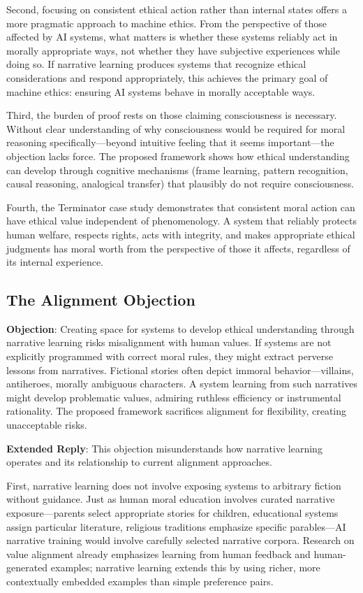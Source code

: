 \documentclass[12pt]{article}
\begin{document}
Second, focusing on consistent ethical action rather than internal states offers a more pragmatic approach to machine ethics. From the perspective of those affected by AI systems, what matters is whether these systems reliably act in morally appropriate ways, not whether they have subjective experiences while doing so. If narrative learning produces systems that recognize ethical considerations and respond appropriately, this achieves the primary goal of machine ethics: ensuring AI systems behave in morally acceptable ways.

Third, the burden of proof rests on those claiming consciousness is necessary. Without clear understanding of why consciousness would be required for moral reasoning specifically---beyond intuitive feeling that it seems important---the objection lacks force. The proposed framework shows how ethical understanding can develop through cognitive mechanisms (frame learning, pattern recognition, causal reasoning, analogical transfer) that plausibly do not require consciousness.

Fourth, the Terminator case study demonstrates that consistent moral action can have ethical value independent of phenomenology. A system that reliably protects human welfare, respects rights, acts with integrity, and makes appropriate ethical judgments has moral worth from the perspective of those it affects, regardless of its internal experience.

\subsection{The Alignment Objection}

\textbf{Objection}: Creating space for systems to develop ethical understanding through narrative learning risks misalignment with human values. If systems are not explicitly programmed with correct moral rules, they might extract perverse lessons from narratives. Fictional stories often depict immoral behavior---villains, antiheroes, morally ambiguous characters. A system learning from such narratives might develop problematic values, admiring ruthless efficiency or instrumental rationality. The proposed framework sacrifices alignment for flexibility, creating unacceptable risks.

\textbf{Extended Reply}: This objection misunderstands how narrative learning operates and its relationship to current alignment approaches.

First, narrative learning does not involve exposing systems to arbitrary fiction without guidance. Just as human moral education involves curated narrative exposure---parents select appropriate stories for children, educational systems assign particular literature, religious traditions emphasize specific parables---AI narrative training would involve carefully selected narrative corpora. Research on value alignment already emphasizes learning from human feedback and human-generated examples; narrative learning extends this by using richer, more contextually embedded examples than simple preference pairs.
\end{document}

